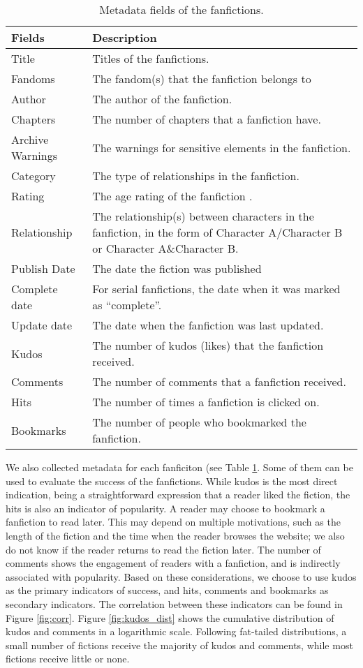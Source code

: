\documentclass[a4paper]{article}
\begin{document}
\begin{table}
\centering
\begin{tabular}[width=0.8\textwidth]{p{3cm}p{10cm}}
\toprule
Fields & Description \\ 
   \hline			
Title & Titles of the fanfictions.  \\
Fandoms & The fandom(s) that the fanfiction belongs to \\
Author & The author of the fanfiction.  \\
Chapters & The number of chapters that a fanfiction have. \\
Archive Warnings & The warnings for sensitive elements in the fanfiction. \\
Category & The type of relationships in the fanfiction. \\
Rating & The age rating of the fanfiction . \\
Relationship & The relationship(s) between characters in the fanfiction, in the form of Character A/Character B
or Character A\&Character B. \\
Publish Date & The date the fiction was published \\
Complete date & For serial fanfictions, the date when it was marked as ``complete''.\\
Update date & The date when the fanfiction was last updated. \\
\hline
Kudos & The number of kudos (likes) that the fanfiction received. \\
Comments & The number of comments that a fanfiction received.\\
Hits & The number of times a fanfiction is clicked on. \\
Bookmarks & The number of people who bookmarked the fanfiction.\\

\bottomrule
\end{tabular}
\caption{Metadata fields of the fanfictions.}
\label{tab:metadata}
\end{table}%

We also collected metadata for each fanficiton (see Table \ref{tab:metadata}. Some of them can be used to evaluate the success of the fanfictions. While kudos is the most direct indication, being a straightforward expression that a reader liked the fiction, the hits is also an indicator of popularity. A reader may choose to bookmark a fanfiction to read later. This may depend on multiple motivations, such as the length of the fiction and the time when the reader browses the website; we also do not know if the reader returns to read the fiction later. The number of comments shows the engagement of readers with a fanfiction, and is indirectly associated with popularity. Based on these considerations, we choose to use kudos as the primary indicators of success, and hits, comments and bookmarks as secondary indicators. The correlation between these indicators can be found in Figure \ref{fig:corr}. Figure \ref{fig:kudos_dist} shows the cumulative distribution of kudos and comments in a logarithmic scale. Following fat-tailed distributions, a small number of fictions receive the majority of kudos and comments, while most fictions receive little or none. 
\end{document}
